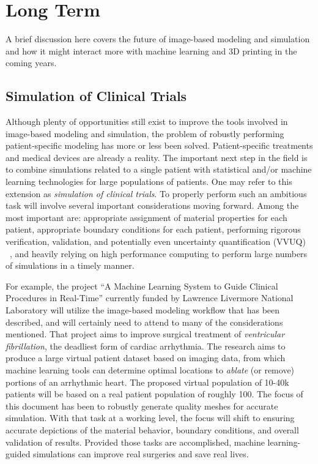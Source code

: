 \section{Long Term}
\label{Long Term}

A brief discussion here covers the future of image-based modeling and simulation and how it might interact more with machine learning and 3D printing in the coming years.

\subsection{Simulation of Clinical Trials}
\label{Simulation of Clinical Trials}

Although plenty of opportunities still exist to improve the tools involved in image-based modeling and simulation, the problem of robustly performing patient-specific modeling has more or less been solved. Patient-specific treatments and medical devices are already a reality. The important next step in the field is to combine simulations related to a single patient with statistical and/or machine learning technologies for large populations of patients. One may refer to this extension as \textit{simulation of clinical trials}. To properly perform such an ambitious task will involve several important considerations moving forward. Among the most important are: appropriate assignment of material properties for each patient, appropriate boundary conditions for each patient, performing rigorous verification, validation, and potentially even uncertainty quantification (VVUQ) ~\cite{NAP13395}, and heavily relying on high performance computing to perform large numbers of simulations in a timely manner.

For example, the project ``A Machine Learning System to Guide Clinical Procedures in Real-Time'' currently funded by Lawrence Livermore National Laboratory will utilize the image-based modeling workflow that has been described, and will certainly need to attend to many of the considerations mentioned. That project aims to improve surgical treatment of \textit{ventricular fibrillation}, the deadliest form of cardiac arrhythmia. The research aims to produce a large virtual patient dataset based on imaging data, from which machine learning tools can determine optimal locations to \textit{ablate} (or remove) portions of an arrhythmic heart. The proposed virtual population of 10-40k patients will be based on a real patient population of roughly 100. The focus of this document has been to robustly generate quality meshes for accurate simulation. With that task at a working level, the focus will shift to ensuring accurate depictions of the material behavior, boundary conditions, and overall validation of results. Provided those tasks are accomplished, machine learning-guided simulations can improve real surgeries and save real lives.

